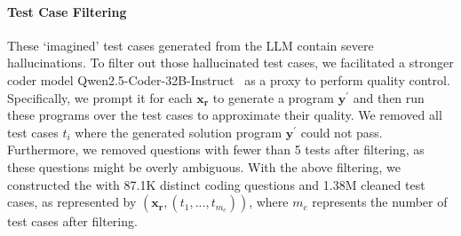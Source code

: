 \paragraph{Test Case Filtering}
\label{subsecp:test_case_consistency}
These `imagined' test cases generated from the LLM contain severe hallucinations. To filter out those hallucinated test cases, we facilitated a stronger coder model Qwen2.5-Coder-32B-Instruct~\citep{Hui2024Qwen25CoderTR} as a proxy to perform quality control. Specifically, we prompt it for each $\mathbf{x_r}$ to generate a program $\mathbf{y}^{\prime}$ and then run these programs over the test cases to approximate their quality. We removed all test cases $t_i$ where the generated solution program $\mathbf{y}^{\prime}$ could not pass. Furthermore, we removed questions with fewer than 5 tests after filtering, as these questions might be overly ambiguous. With the above filtering, we constructed the \dataset{} with 87.1K distinct coding questions and 1.38M cleaned test cases, as represented by $(\mathbf{x_r}, (t_1,...,t_{m_c}))$, where $m_c$ represents the number of test cases after filtering.




